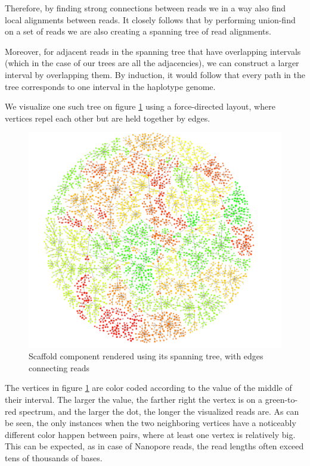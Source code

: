 Therefore, by finding strong connections between reads we in a way also find local alignments between reads. It closely follows that by performing union-find on a set of reads we are also creating a spanning tree of read alignments.

Moreover, for adjacent reads in the spanning tree that have overlapping intervals (which in the case of our trees are all the adjacencies), we can construct a larger interval by overlapping them. By induction, it would follow that every path in the tree corresponds to one interval in the haplotype genome.

We visualize one such tree on figure \ref{fig:tree} using a force-directed layout, where vertices repel each other but are held together by edges.

\begin{figure}
\includegraphics[width=450bp]{figures/tree.png}
\caption{Scaffold component rendered using its spanning tree, with edges connecting reads}
\label{fig:tree}
\end{figure}

The vertices in figure \ref{fig:tree} are color coded according to the value of the middle of their interval. The larger the value, the farther right the vertex is on a green-to-red spectrum, and the  larger the dot, the longer the visualized reads are. As can be seen, the only instances when the two neighboring vertices have a noticeably different color happen between pairs, where at least one vertex is relatively big. This can be expected, as in case of Nanopore reads, the read lengths often exceed tens of thousands of bases.

